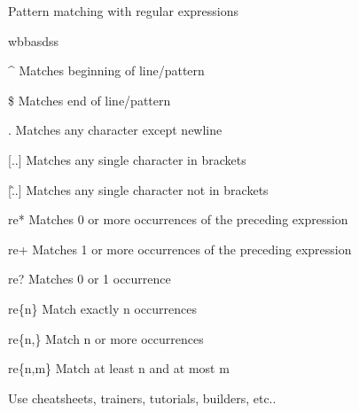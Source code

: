 \begin{frame}{Pattern matching with regular expressions}
\begin{adjustwidth}{2.5em}{0pt}
  \begin{mydescription}{wbbasdss}
    \itemsep3pt
    \item[\^]  Matches beginning of line/pattern
    \item[\$]  Matches end of line/pattern
    \item[. ]  Matches any character except newline
    \item[{[}..{]}]   Matches any single character in brackets
    \item[{[}\^..{]}]  Matches any single character not in brackets
    \item[re*]  Matches 0 or more occurrences of the preceding expression
    \item[re+]  Matches 1 or more occurrences of the preceding expression
    \item[re?]   Matches 0 or 1 occurrence
    \item[re\{n\}]  Match exactly n occurrences
    \item[re\{n,\}]   Match n or more occurrences
    \item[re\{n,m\}]   Match at least n and at most m
  \end{mydescription}
\end{adjustwidth}
  \vspace{0.3cm}
  \pause
  \begin{arrowlist}
    \item Use cheatsheets, trainers, tutorials, builders, etc..
  \end{arrowlist}
\end{frame}


